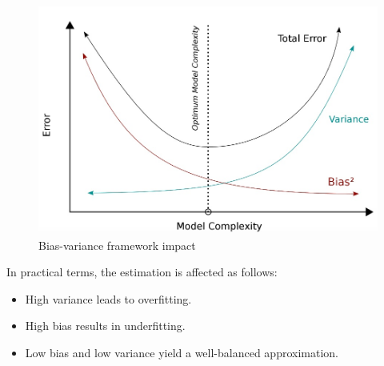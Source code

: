 \begin{figure}[H]
    \centering
    \includegraphics[width=0.5\linewidth]{images/bvf1.png}
    \caption{Bias-variance framework impact}
\end{figure}
In practical terms, the estimation is affected as follows:
\begin{itemize}
    \item High variance leads to overfitting.
    \item High bias results in underfitting.
    \item Low bias and low variance yield a well-balanced approximation.
\end{itemize}
